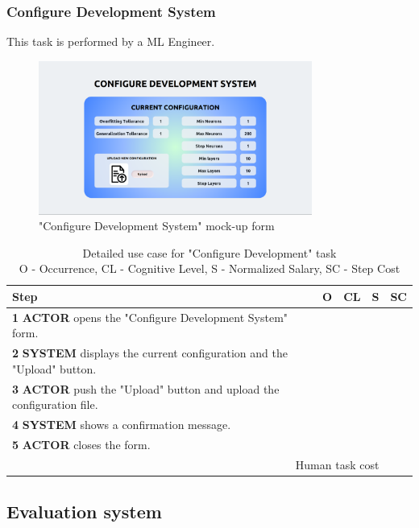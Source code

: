 \subsubsection{Configure Development System}
This task is performed by a ML Engineer.

\begin{figure}[H]
\centering
\includegraphics[width=0.8\textwidth]{figures/ui_configure_development.png}
\caption{"Configure Development System" mock-up form}
\end{figure}

\begin{table}[H]
\centering
\begin{tabularx}{\textwidth}{|X|c|c|c|c|}
\hline
\textbf{Step} & \textbf{O} & \textbf{CL} & \textbf{S} & \textbf{SC} \\
\hline
\textbf{1} \textbf{ACTOR} opens the "Configure Development System" form. &  & & & \\
\hline
\textbf{2} \textbf{SYSTEM} displays the current configuration and the "Upload" button.& & & & \\
\hline
\textbf{3} \textbf{ACTOR} push the "Upload" button and upload the configuration file. & & & &\\
\hline
\textbf{4} \textbf{SYSTEM} shows a confirmation message. & & & & \\
\hline
\textbf{5} \textbf{ACTOR} closes the form. & & & & \\
\hline
\multicolumn{4}{|r|}{Human task cost} & \\
\hline
\end{tabularx}
\caption{Detailed use case for "Configure Development" task\\ 
O - Occurrence, CL - Cognitive Level, S - Normalized Salary, SC - Step Cost}
\label{table:configure_development_system}
\end{table}
\subsection{Evaluation system}

